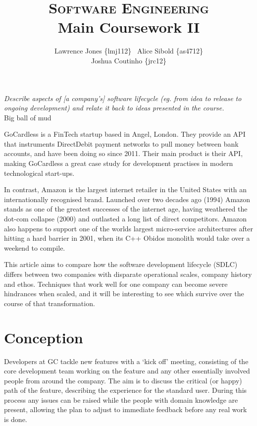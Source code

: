 \documentclass[11pt]{article}
\title{\textsc{Software Engineering}\\Main Coursework II}
\author{Lawrence Jones \{lmj112\} \  Alice Sibold \{as4712\} \\
        Joshua Coutinho \{jrc12\}}
\date{}
\begin{document}
\maketitle


\textit{Describe aspects of [a company's] software lifecycle (eg. from idea to release
to ongoing development) and relate it back to ideas presented in the course.}
\\

Big ball of mud\cite{bigBallOfMud}

GoCardless is a FinTech startup based in Angel, London. They provide an API that
instruments DirectDebit payment networks to pull money between bank accounts,
and have been doing so since 2011. Their main product is their API, making
GoCardless a great case study for development practises in modern technological
start-ups.

In contrast, Amazon is the largest internet retailer in the United States with
an internationally recognised brand. Launched over two decades ago (1994) Amazon
stands as one of the greatest successes of the internet age, having weathered
the dot-com collapse (2000) and outlasted a long list of direct competitors.
Amazon also happens to support one of the worlds largest micro-service
architectures after hitting a hard barrier in 2001, when its C++ Obidos monolith
would take over a weekend to compile.

This article aims to compare how the software development lifecycle (SDLC)
differs between two companies with disparate operational scales, company history
and ethos. Techniques that work well for one company can become severe
hindrances when scaled, and it will be interesting to see which survive over
the course of that transformation.

\section{Conception}

Developers at GC tackle new features with a ‘kick off' meeting, consisting of
the core development team working on the feature and any other essentially
involved people from around the company. The aim is to discuss the critical (or
happy) path of the feature, describing the experience for the standard user.
During this process any issues can be raised while the people with domain
knowledge are present, allowing the plan to adjust to immediate feedback before
any real work is done.
\end{document}

